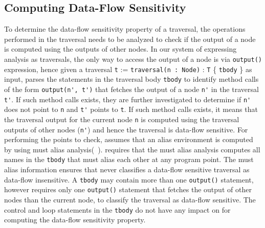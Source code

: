 

\subsection{Computing Data-Flow Sensitivity}
\label{sec:df-algo}
To determine the data-flow sensitivity property of a traversal, the operations
performed in the traversal needs to be analyzed to check if the output of a
node is computed using the outputs of other nodes. In our system of expressing
analysis as traversals, the only way to access the output of a node is via
\lstinline|output()| expression, hence given a traversal \lstinline|t| :=
\lstinline|traversal(n : Node)| :
\lstinline|T| \{ \lstinline|tbody| \} as input, 
parses the statements in the traversal body \lstinline|tbody| to identify method
calls of the form \lstinline|output(n', t')| that fetches the output of a node
\lstinline|n'| in the traversal \lstinline|t'|. If such method calls exists,
they are further investigated to determine if \lstinline|n'| does not point to
\lstinline|n| and \lstinline|t'| points to \lstinline|t|.
If such method calls exists, it means that the traversal output for the current
node \lstinline|n| is computed using the traversal outputs of other nodes
(\lstinline|n'|) and hence the traversal is data-flow sensitive.
For performing the points to check,  assumes that
an alias environment is computed by using must alias
analysis(~\cite{must-alias}).  requires that
the must alias analysis computes all names in the \lstinline|tbody| that must
alias each other at any program point. The must alias information ensures that
 never classifies a data-flow sensitive traversal
as data-flow insensitive.
A \lstinline|tbody| may contain more than one \lstinline|output()| statement,
however  requires only one \lstinline|output()|
statement that fetches the output of other nodes than the current node, to
classify the traversal as data-flow sensitive. The control and loop statements
in the \lstinline|tbody| do not have any impact on 
for computing the data-flow sensitivity property.

